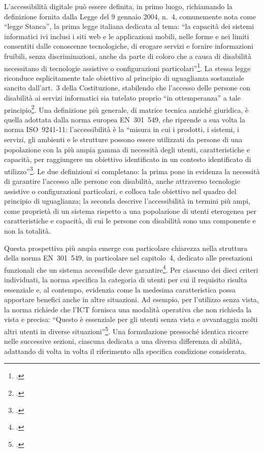 L'accessibilità digitale può essere definita, in primo luogo, richiamando la definizione fornita dalla Legge del 9 gennaio 2004, n.~4, comunemente nota come \enquote{legge Stanca}, la prima legge italiana dedicata al tema: \enquote{la capacità dei sistemi informatici ivi inclusi i siti web e le applicazioni mobili, nelle forme e nei limiti consentiti dalle conoscenze tecnologiche, di erogare servizi e fornire informazioni fruibili, senza discriminazioni, anche da parte di coloro che a causa di disabilità necessitano di tecnologie assistive o configurazioni particolari}\footcite[art.~2, comma~1, lett.~a]{legge:stanca}. La stessa legge riconduce esplicitamente tale obiettivo al principio di uguaglianza sostanziale sancito dall'art.~3 della Costituzione, stabilendo che l'accesso delle persone con disabilità ai servizi informatici sia tutelato proprio \enquote{in ottemperanza} a tale principio\footcite[art.~1, comma~2]{legge:stanca}. Una definizione più generale, di matrice tecnica anziché giuridica, è quella adottata dalla norma europea EN~301~549, che riprende a sua volta la norma ISO~9241-11: l'accessibilità è la \enquote{misura in cui i prodotti, i sistemi, i servizi, gli ambienti e le strutture possono essere utilizzati da persone di una popolazione con la più ampia gamma di necessità degli utenti, caratteristiche e capacità, per raggiungere un obiettivo identificato in un contesto identificato di utilizzo}\footcite[cap.~3, voce \enquote{accessibilità}, da ISO~9241-11:2018]{norma:en301549}. Le due definizioni si completano: la prima pone in evidenza la necessità di garantire l'accesso alle persone con disabilità, anche attraverso tecnologie assistive o configurazioni particolari, e colloca tale obiettivo nel quadro del principio di uguaglianza; la seconda descrive l'accessibilità in termini più ampi, come proprietà di un sistema rispetto a una popolazione di utenti eterogenea per caratteristiche e capacità, di cui le persone con disabilità sono una componente e non la totalità.

Questa prospettiva più ampia emerge con particolare chiarezza nella struttura della norma EN~301~549, in particolare nel capitolo~4, dedicato alle prestazioni funzionali che un sistema accessibile deve garantire\footcite[cap.~4 \enquote{Prestazioni funzionali}]{norma:en301549}. Per ciascuno dei dieci criteri individuati, la norma specifica la categoria di utenti per cui il requisito risulta essenziale e, al contempo, evidenzia come la medesima caratteristica possa apportare benefici anche in altre situazioni. Ad esempio, per l'utilizzo senza vista, la norma richiede che l'ICT fornisca una modalità operativa che non richieda la vista e precisa: \enquote{Questo è essenziale per gli utenti senza vista e avvantaggia molti altri utenti in diverse situazioni}\footcite[§~4.2.1 \enquote{Utilizzo senza vista}]{norma:en301549}. Una formulazione pressoché identica ricorre nelle successive sezioni, ciascuna dedicata a una diversa differenza di abilità, adattando di volta in volta il riferimento alla specifica condizione considerata.

